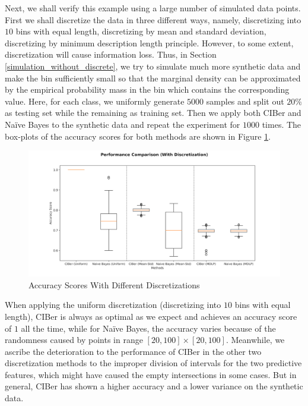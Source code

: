 \documentclass[twoside,11pt]{article}
\begin{document}
Next, we shall verify this example using a large number of simulated data points. First we shall discretize the data in three different ways, namely, discretizing into $10$ bins with equal length, discretizing by mean and standard deviation, discretizing by minimum description length principle. However, to some extent, discretization will cause information loss. Thus, in Section \ref{simulation_without_discrete}, we try to simulate much more synthetic data and make the bin sufficiently small so that the marginal density can be approximated by the empirical probability mass in the bin which contains the corresponding value. Here, for each class, we uniformly generate $5000$ samples and split out $20\%$ as testing set while the remaining as training set. Then we apply both CIBer and Na\"ive Bayes to the synthetic data and repeat the experiment for $1000$ times. The box-plots of the accuracy scores for both methods are shown in Figure \ref{with_discretize}.

\begin{figure}[!htbp]
    \includegraphics[scale=0.5]{Figures/simulation/With discretization.png}
    \caption{Accuracy Scores With Different Discretizations}
    \label{with_discretize}
\end{figure}

When applying the uniform discretization (discretizing into $10$ bins with equal length), CIBer is always as optimal as we expect and achieves an accuracy score of $1$ all the time, while for Na\"ive Bayes, the accuracy varies because of the randomness caused by points in range $[20,100]\times[20,100]$. Meanwhile, we ascribe the deterioration to the performance of CIBer in the other two discretization methods to the improper division of intervals for the two predictive features, which might have caused the empty intersections in some cases. But in general, CIBer has shown a higher accuracy and a lower variance on the synthetic data.
\end{document}
